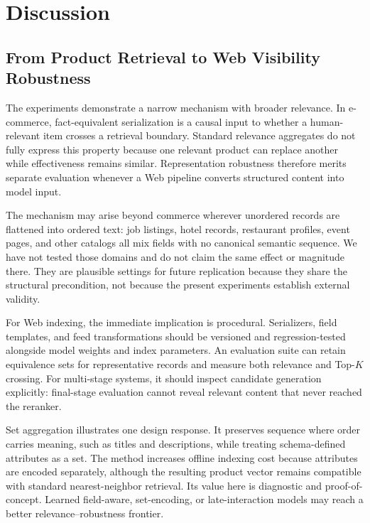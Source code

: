 \section{Discussion}

\subsection{From Product Retrieval to Web Visibility Robustness}

The experiments demonstrate a narrow mechanism with broader relevance. In e-commerce, fact-equivalent serialization is a causal input to whether a human-relevant item crosses a retrieval boundary. Standard relevance aggregates do not fully express this property because one relevant product can replace another while effectiveness remains similar. Representation robustness therefore merits separate evaluation whenever a Web pipeline converts structured content into model input.

The mechanism may arise beyond commerce wherever unordered records are flattened into ordered text: job listings, hotel records, restaurant profiles, event pages, and other catalogs all mix fields with no canonical semantic sequence. We have not tested those domains and do not claim the same effect or magnitude there. They are plausible settings for future replication because they share the structural precondition, not because the present experiments establish external validity.

For Web indexing, the immediate implication is procedural. Serializers, field templates, and feed transformations should be versioned and regression-tested alongside model weights and index parameters. An evaluation suite can retain equivalence sets for representative records and measure both relevance and Top-$K$ crossing. For multi-stage systems, it should inspect candidate generation explicitly: final-stage evaluation cannot reveal relevant content that never reached the reranker.

Set aggregation illustrates one design response. It preserves sequence where order carries meaning, such as titles and descriptions, while treating schema-defined attributes as a set. The method increases offline indexing cost because attributes are encoded separately, although the resulting product vector remains compatible with standard nearest-neighbor retrieval. Its value here is diagnostic and proof-of-concept. Learned field-aware, set-encoding, or late-interaction models may reach a better relevance--robustness frontier.

